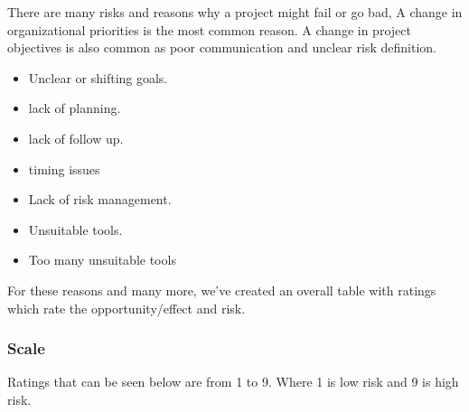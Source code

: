There are many risks and reasons why a project might fail or go bad, A change in organizational priorities is the most common reason. A change in project objectives is also common as poor communication and unclear risk definition.
	\begin{itemize}
		\setlength\itemsep{-0.2em}
		\item Unclear or shifting goals.
		\item lack of planning.
		\item lack of follow up.
		\item timing issues 
		\item Lack of risk management.
		\item Unsuitable tools.
		\item Too many unsuitable tools
	\end{itemize}

\noindent
For these reasons and many more, we’ve created an overall table with ratings which rate the opportunity/effect and risk.

\subsubsection{Scale} %
Ratings that can be seen below are from 1 to 9. Where 1 is low risk and 9 is high risk.\\
	
